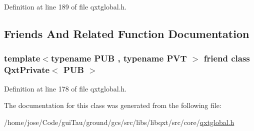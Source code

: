Definition at line 189 of file qxtglobal.\-h.



\subsection{Friends And Related Function Documentation}
\hypertarget{class_qxt_private_interface_a1a9e74afa6faa815c02bc2f184b21c68}{
\subsubsection[{Qxt\-Private$<$ P\-U\-B $>$}]{\setlength{\rightskip}{0pt plus 5cm}template$<$typename P\-U\-B , typename P\-V\-T $>$ friend class {\bf Qxt\-Private}$<$ P\-U\-B $>$\hspace{0.3cm}{\ttfamily [friend]}}}\label{class_qxt_private_interface_a1a9e74afa6faa815c02bc2f184b21c68}


Definition at line 178 of file qxtglobal.\-h.



The documentation for this class was generated from the following file\-:\begin{DoxyCompactItemize}
\item 
/home/jose/\-Code/gui\-Tau/ground/gcs/src/libs/libqxt/src/core/\hyperlink{qxtglobal_8h}{qxtglobal.\-h}\end{DoxyCompactItemize}
